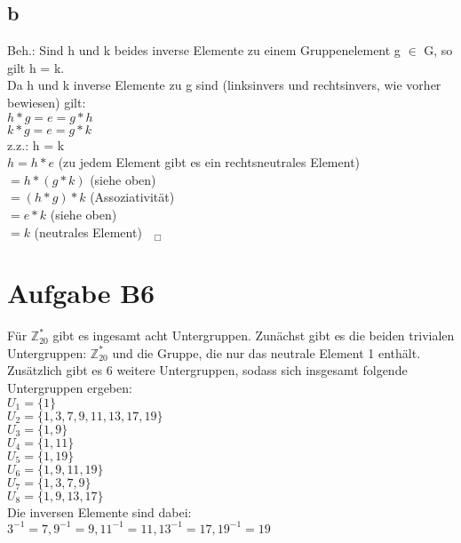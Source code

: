 \documentclass[11pt,a4paper]{article}
\begin{document}
\subsection*{b}
Beh.: Sind h und k beides inverse Elemente zu einem Gruppenelement g $\in$ G, so gilt h = k. \\

Da h und k inverse Elemente zu g sind (linksinvers und rechtsinvers, wie vorher bewiesen) gilt: \\
$ h \ast  g = e = g \ast  h$ \\
$ k \ast  g = e = g \ast  k$  \\

z.z.: h = k \\
$h = h \ast e$   (zu jedem Element gibt es ein rechtsneutrales Element) \\
$= h \ast (g \ast k)$    (siehe oben) \\
$= (h \ast g) \ast k$    (Assoziativität) \\
$= e \ast k$      (siehe oben) \\
$=k$       (neutrales Element) $~~~_\Box$ \\

\section*{Aufgabe B6}
Für $\mathbb{Z}^{*}_{20}$ gibt es ingesamt acht Untergruppen. Zunächst gibt es die beiden trivialen Untergruppen:  $\mathbb{Z}^{*}_{20}$ und die Gruppe, die nur das neutrale Element 1 enthält. Zusätzlich gibt es 6 weitere Untergruppen, sodass sich insgesamt folgende Untergruppen ergeben: \\

$U_1 =\{1\}$ \\
$U_2 = \{1,3,7,9,11,13,17,19\}$\\
$U_3=\{1,9\}$\\
$U_4=\{1,11\}$\\
$U_5=\{1,19\}$\\
$U_6=\{1,9,11,19\}$\\
$U_7=\{1,3,7,9\}$\\
$U_8=\{1,9,13,17\}$\\

Die inversen Elemente sind dabei: \\
$3^{-1}=7, 9^{-1}=9, 11^{-1}=11, 13^{-1}=17, 19^{-1}=19$\\
\end{document}
